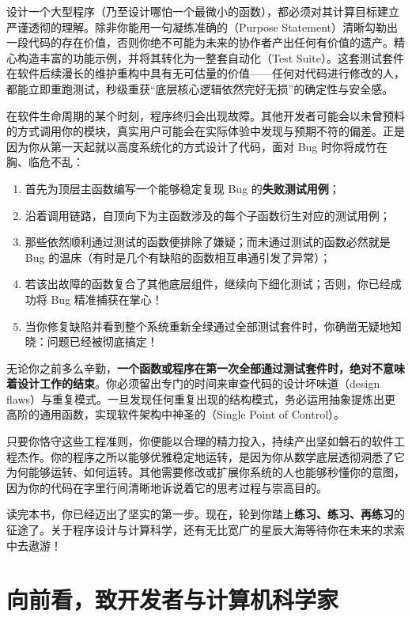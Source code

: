 设计一个大型程序（乃至设计哪怕一个最微小的函数），都必须对其计算目标建立严谨透彻的理解。除非你能用一句凝练准确的（Purpose Statement）清晰勾勒出一段代码的存在价值，否则你绝不可能为未来的协作者产出任何有价值的遗产。精心构造丰富的功能示例，并将其转化为一整套自动化（Test Suite）。这套测试套件在软件后续漫长的维护重构中具有无可估量的价值——任何对代码进行修改的人，都能立即重跑测试，秒级重获“底层核心逻辑依然完好无损”的确定性与安全感。

在软件生命周期的某个时刻，程序终归会出现故障。其他开发者可能会以未曾预料的方式调用你的模块，真实用户可能会在实际体验中发现与预期不符的偏差。正是因为你从第一天起就以高度系统化的方式设计了代码，面对 Bug 时你将成竹在胸、临危不乱：
\begin{enumerate}
  \item 首先为顶层主函数编写一个能够稳定复现 Bug 的\textbf{失败测试用例}；
  \item 沿着调用链路，自顶向下为主函数涉及的每个子函数衍生对应的测试用例；
  \item 那些依然顺利通过测试的函数便排除了嫌疑；而未通过测试的函数必然就是 Bug 的温床（有时是几个有缺陷的函数相互串通引发了异常）；
  \item 若该出故障的函数复合了其他底层组件，继续向下细化测试；否则，你已经成功将 Bug 精准捕获在掌心！
  \item 当你修复缺陷并看到整个系统重新全绿通过全部测试套件时，你确凿无疑地知晓：问题已经被彻底搞定！
\end{enumerate}

无论你之前多么辛勤，\textbf{一个函数或程序在第一次全部通过测试套件时，绝对不意味着设计工作的结束}。你必须留出专门的时间来审查代码的设计坏味道（design flaws）与重复模式。一旦发现任何重复出现的结构模式，务必运用抽象提炼出更高阶的通用函数，实现软件架构中神圣的（Single Point of Control）。

只要你恪守这些工程准则，你便能以合理的精力投入，持续产出坚如磐石的软件工程杰作。你的程序之所以能够优雅稳定地运转，是因为你从数学底层透彻洞悉了它为何能够运转、如何运转。其他需要修改或扩展你系统的人也能够秒懂你的意图，因为你的代码在字里行间清晰地诉说着它的思考过程与崇高目的。

读完本书，你已经迈出了坚实的第一步。现在，轮到你踏上\textbf{练习、练习、再练习}的征途了。关于程序设计与计算科学，还有无比宽广的星辰大海等待你在未来的求索中去遨游！

\section*{向前看，致开发者与计算机科学家}
\label{sec:epilogue_cs}

